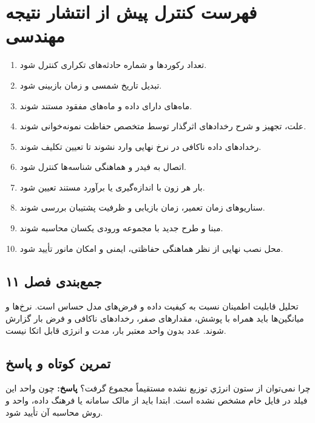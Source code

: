 \documentclass[11pt,a4paper,oneside]{book}
\newcommand{\summary}[1]{\subsection*{جمع‌بندی فصل #1}}
\newcommand{\exercise}{\subsection*{تمرین کوتاه و پاسخ}}
\newcommand{\answer}{\noindent\textbf{پاسخ:} }
\begin{document}
\section{فهرست کنترل پیش از انتشار نتیجه مهندسی}
\begin{enumerate}
\item تعداد رکوردها و شماره حادثه‌های تکراری کنترل شود.
\item تبدیل تاریخ شمسی و زمان  بازبینی شود.
\item ماه‌های دارای داده و ماه‌های مفقود مستند شوند.
\item علت، تجهیز و شرح رخدادهای اثرگذار توسط متخصص حفاظت نمونه‌خوانی شوند.
\item رخدادهای داده ناکافی در نرخ نهایی وارد نشوند تا تعیین تکلیف شوند.
\item اتصال  به فیدر و هماهنگی شناسه‌ها کنترل شود.
\item بار هر زون با اندازه‌گیری یا برآورد مستند تعیین شود.
\item سناریوهای زمان تعمیر، زمان بازیابی و ظرفیت پشتیبان بررسی شوند.
\item {} مبنا و طرح جدید با مجموعه ورودی یکسان محاسبه شوند.
\item محل نصب نهایی از نظر هماهنگی حفاظتی، ایمنی و امکان مانور تأیید شود.
\end{enumerate}

\summary{۱۱}
تحلیل قابلیت اطمینان نسبت به کیفیت داده و فرض‌های مدل حساس است. نرخ‌ها و میانگین‌ها باید همراه با پوشش، مقدارهای صفر، رخدادهای ناکافی و فرض بار گزارش شوند. عدد  بدون واحد معتبر بار، مدت و انرژی قابل اتکا نیست.

\exercise
چرا نمی‌توان از ستون انرژي توزيع نشده مستقیماً مجموع  گرفت؟
\answer چون واحد این فیلد در فایل خام مشخص نشده است. ابتدا باید از مالک سامانه یا فرهنگ داده، واحد و روش محاسبه آن تأیید شود.
\end{document}
